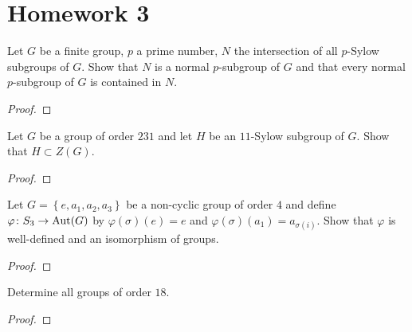 \chapter{Homework 3}
\begin{problem}
Let $G$ be a finite group, $p$ a prime number, $N$ the intersection of all
$p$-Sylow subgroups of $G$. Show that $N$ is a normal $p$-subgroup of $G$
and that every normal $p$-subgroup of $G$ is contained in $N$.
\end{problem}
\begin{proof}
\end{proof}

\begin{problem}
Let $G$ be a group of order $231$ and let $H$ be an $11$-Sylow subgroup of
$G$. Show that $H\subset Z(G)$.
\end{problem}
\begin{proof}
\end{proof}

\begin{problem}
Let $G=\left\{e,a_1,a_2,a_3\right\}$ be a non-cyclic group of order $4$ and
define $\varphi\colon S_3\to\operatorname{Aut}(G)$ by $\varphi(\sigma)(e)=e$ and
$\varphi(\sigma)(a_1)=a_{\sigma(i)}$. Show that $\varphi$ is well-defined and an
isomorphism of groups.
\end{problem}
\begin{proof}
\end{proof}

\begin{problem}
Determine all groups of order $18$.
\end{problem}
\begin{proof}
\end{proof}

